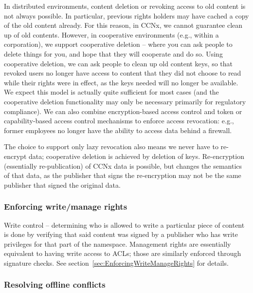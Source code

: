 In distributed environments, content deletion or revoking access to
old content is not always possible. In particular, previous rights
holders may have cached a copy of the old content already. For this
reason, in CCNx, we cannot guarantee clean up of old
contents. However, in cooperative environments (e.g., within a
corporation), we support cooperative deletion -- where you can ask
people to delete things for you, and hope that they will cooperate and
do so. Using cooperative deletion, we can ask people to clean up old
content keys, so that revoked users no longer have access to content
that they did not choose to read while their rights were in effect, as
the keys needed will no longer be available. We expect this model is
actually quite sufficient for most cases (and the cooperative deletion
functionality may only be necessary primarily for regulatory
compliance). We can also combine encryption-based access control and
token or capability-based access control mechanisms to enforce access
revocation: e.g., former employees no longer have the ability to
access data behind a firewall.

The choice to support only lazy revocation also means we never have to
re-encrypt data; cooperative deletion is achieved by deletion of
keys. Re-encryption (essentially re-publication) of CCNx data is
possible, but changes the semantics of that data, as the publisher
that signs the re-encryption may not be the same publisher that signed
the original data.

\subsubsection{Enforcing write/manage rights}

Write control -- determining who is allowed to write a particular
piece of content is done by verifying that said content was signed by
a publisher who has write privileges for that part of the
namespace. Management rights are essentially equivalent to having
write access to ACLs; those are similarly enforced through signature
checks. See section~\ref{sec:EnforcingWriteManageRights} for details.

\subsubsection{Resolving offline conflicts}

